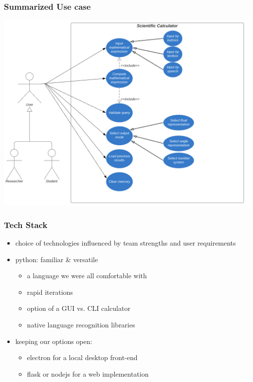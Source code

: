 \documentclass{beamer}
\begin{document}
\begin{frame}
\frametitle{Summarized Use case}
\includegraphics[scale=0.5]{Use Case}
\end{frame}



\begin{frame}
\frametitle{Tech Stack}
 \begin{itemize}
  \item choice of technologies influenced by team strengths and user requirements
  \item python: familiar \& versatile
   \begin{itemize}
    \item a language we were all comfortable with
    \item rapid iterations
    \item option of a GUI vs. CLI calculator
    \item native language recognition libraries
   \end{itemize}
  \item keeping our options open:
   \begin{itemize}
    \item electron for a local desktop front-end
    \item flask or nodejs for a web implementation
   \end{itemize}
  \end{itemize}
\end{frame}
\end{document}
